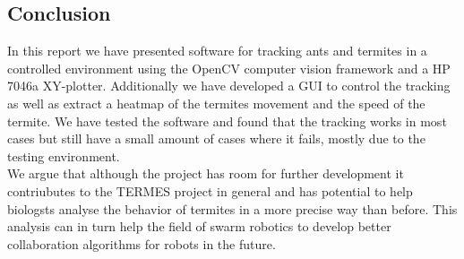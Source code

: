 
\subsection{Conclusion}

In this report we have presented software for tracking ants and termites in a controlled environment using the OpenCV computer vision framework and a HP 7046a XY-plotter. Additionally we have developed a GUI to control the tracking as well as extract a heatmap of the termites movement and the speed of the termite. We have tested the software and found that the tracking works in most cases but still have a small amount of cases where it fails, mostly due to the testing environment. \\

We argue that although the project has room for further development it contriubutes to the TERMES project in general and has potential to help biologsts analyse the behavior of termites in a more precise way than before. This analysis can in turn help the field of swarm robotics to develop better collaboration algorithms for robots in the future.

